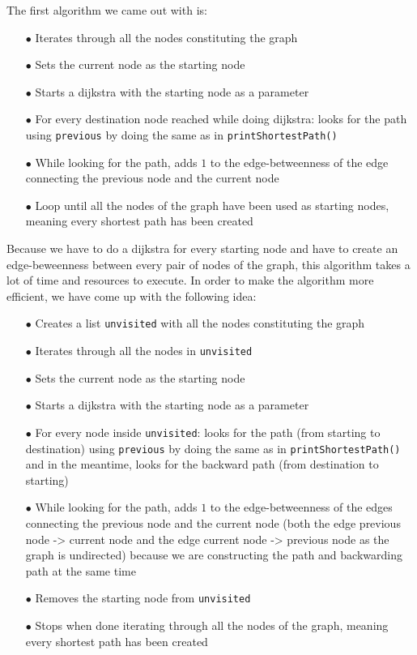\documentclass{article}
\begin{document}
The first algorithm we came out with is:

\begin{itemize}
\item[$\bullet$] Iterates through all the nodes constituting the graph
\item[$\bullet$] Sets the current node as the starting node
\item[$\bullet$] Starts a dijkstra with the starting node as a parameter
\item[$\bullet$] For every destination node reached while doing dijkstra: looks for the path using \texttt{previous} by doing the same as in \texttt{printShortestPath()}
\item[$\bullet$] While looking for the path, adds $1$ to the edge-betweenness of the edge connecting the previous node and the current node
\item[$\bullet$] Loop until all the nodes of the graph have been used as starting nodes, meaning every shortest path has been created
\end{itemize}

\medbreak

Because we have to do a dijkstra for every starting node and have to create an edge-beweenness between every pair of nodes of the graph, this algorithm takes a lot of time and resources to execute.
In order to make the algorithm more efficient, we have come up  with the following idea:

\begin{itemize}
\item[$\bullet$] Creates a list \texttt{unvisited} with all the nodes constituting the graph
\item[$\bullet$] Iterates through all the nodes in \texttt{unvisited}
\item[$\bullet$] Sets the current node as the starting node
\item[$\bullet$] Starts a dijkstra with the starting node as a parameter
\item[$\bullet$] For every node inside \texttt{unvisited}: looks for the path (from starting to destination) using \texttt{previous} by doing the same as in \texttt{printShortestPath()} and in the meantime, looks for the backward path (from destination to starting)
\item[$\bullet$] While looking for the path, adds $1$ to the edge-betweenness of the edges connecting the previous node and the current node (both the edge previous node -> current node and the edge current node -> previous node as the graph is undirected) because we are constructing the path and backwarding path at the same time
\item[$\bullet$] Removes the starting node from \texttt{unvisited}
\item[$\bullet$] Stops when done iterating through all the nodes of the graph, meaning every shortest path has been created
\end{itemize}
\end{document}
